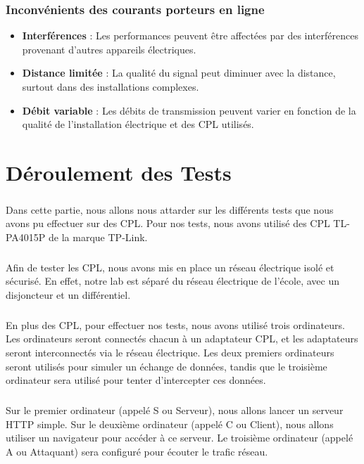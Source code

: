 \documentclass[a4paper,twocolumn]{report}
\begin{document}
\subsection{Inconvénients des courants porteurs en ligne}
\begin{itemize}
	\item \textbf{Interférences} : Les performances peuvent être affectées par des
    interférences provenant d'autres appareils électriques.
	\item \textbf{Distance limitée} : La qualité du signal peut diminuer avec la distance,
    surtout dans des installations complexes.
	\item \textbf{Débit variable} : Les débits de transmission peuvent varier en fonction
    de la qualité de l'installation électrique et des CPL utilisés.
\end{itemize}



\chapter{Déroulement des Tests}
\paragraph{}Dans cette partie, nous allons nous attarder sur les différents tests
que nous avons pu effectuer sur des CPL. Pour nos tests, nous avons utilisé des CPL TL-PA4015P de la marque TP-Link.
\paragraph{}Afin de tester les CPL, nous avons mis en place un réseau électrique
isolé et sécurisé. En effet, notre lab est séparé du réseau électrique de l'école,
avec un disjoncteur et un différentiel.
\paragraph{}En plus des CPL, pour effectuer nos tests, nous avons utilisé trois ordinateurs.
Les ordinateurs seront connectés chacun à un adaptateur CPL, et les adaptateurs 
seront interconnectés via le réseau électrique. Les deux premiers ordinateurs seront utilisés
pour simuler un échange de données, tandis que le troisième ordinateur sera utilisé pour tenter
d'intercepter ces données.
\paragraph{}Sur le premier ordinateur (appelé S ou Serveur), nous allons lancer un serveur HTTP simple.
Sur le deuxième ordinateur (appelé C ou Client), nous allons utiliser un navigateur pour accéder à ce serveur.
Le troisième ordinateur (appelé A ou Attaquant) sera configuré pour écouter le trafic réseau.
\end{document}
